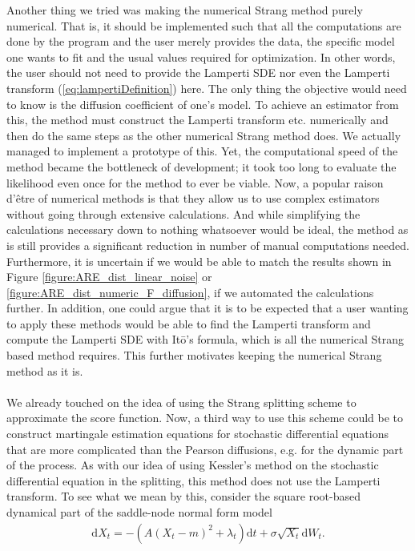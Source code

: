 Another thing we tried was making the numerical Strang method purely numerical. That is, it should be implemented such that all the computations are done by the program and the user merely provides the data, the specific model one wants to fit and the usual values required for optimization. In other words, the user should not need to provide the Lamperti SDE nor even the Lamperti transform (\ref{eq:lampertiDefinition}) here. The only thing the objective would need to know is the diffusion coefficient of one's model. To achieve an estimator from this, the method must construct the Lamperti transform etc. numerically and then do the same steps as the other numerical Strang method does. We actually managed to implement a prototype of this. Yet, the computational speed of the method became the bottleneck of development; it took too long to evaluate the likelihood even once for the method to ever be viable. Now, a popular raison d'être of numerical methods is that they allow us to use complex estimators without going through extensive calculations. And while simplifying the calculations necessary down to nothing whatsoever would be ideal, the method as is still provides a significant reduction in number of manual computations needed. Furthermore, it is uncertain if we would be able to match the results shown in Figure \ref{figure:ARE_dist_linear_noise} or \ref{figure:ARE_dist_numeric_F_diffusion}, if we automated the calculations further. In addition, one could argue that it is to be expected that a user wanting to apply these methods would be able to find the Lamperti transform and compute the Lamperti SDE with Itō's formula, which is all the numerical Strang based method requires. This further motivates keeping the numerical Strang method as it is.\\\\
We already touched on the idea of using the Strang splitting scheme to approximate the score function. Now, a third way to use this scheme could be to construct martingale estimation equations for stochastic differential equations that are more complicated than the Pearson diffusions, e.g. for the dynamic part of the process. As with our idea of using Kessler's method on the stochastic differential equation in the splitting, this method does not use the Lamperti transform. To see what we mean by this, consider the square root-based dynamical part of the saddle-node normal form model
\begin{align}
    \mathrm{d}X_t = -(A(X_t - m)^2 + \lambda_t)\mathrm{d}t + \sigma\sqrt{X_t}\mathrm{d}W_t. \label{eq:squareSplittingDiscussion}
\end{align}  

